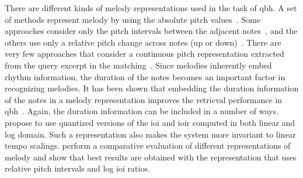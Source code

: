 There are different kinds of melody representations used in the task of \gls{qbh}. A set of methods represent melody by using the absolute pitch values~\citep{McNab1996,uitdenbogerd1998manipulation}. Some approaches consider only the pitch intervals between the adjacent notes~\citep{pauws2004cubyhum}, and the others use only a relative pitch change across notes (up or down)~\citep{ghias1995query}. There are very few approaches that consider a continuous pitch representation extracted from the query excerpt in the matching~\citep{mazzoni2001melody}. Since melodies inherently embed rhythm information, the duration of the notes becomes an important factor in recognizing melodies. It has been shown that embedding the duration information of the notes in a melody representation improves the retrieval performance in \gls{qbh}~\citep{pardo2002encoding}. Again, the duration information can be included in a number of ways. \cite{pardo2002encoding} propose to use quantized versions of the \gls{ioi} and \gls{ioir} computed in both linear and log domain. Such a representation also makes the system more invariant to linear tempo scalings. \cite{dannenberg2007comparative} perform a comparative evaluation of different representations of melody and show that best results are obtained with the representation that uses relative pitch intervals and log \gls{ioi} ratios. 

